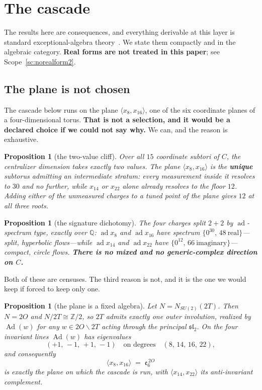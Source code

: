 \documentclass[11pt,reqno]{amsart}
\theoremstyle{plain}
\newtheorem{proposition}[theorem]{Proposition}
\theoremstyle{definition}
\theoremstyle{remark}
\newcommand{\Q}{\mathbb{Q}}
\newcommand{\Z}{\mathbb{Z}}
\newcommand{\sll}{\mathfrak{sl}}
\newcommand{\ee}{\mathfrak{e}}
\newcommand{\ad}{\operatorname{ad}}
\newcommand{\Ad}{\operatorname{Ad}}
\begin{document}
\section{The cascade}\label{sec:cascade}

The results here are consequences, and everything derivable at this layer is standard
exceptional-algebra theory~\cite{Slansky,BartonSudbery}. We state them compactly and in
the algebraic category. \textbf{Real forms are not treated in this paper}; see
Scope~\ref{sc:norealform2}.

\subsection{The plane is not chosen}\label{sec:planeforced}

The cascade below runs on the plane $\langle x_8,x_{16}\rangle$, one of the six coordinate
planes of a four-dimensional torus. \textbf{That is not a selection, and it would be a
declared choice if we could not say why.} We can, and the reason is exhaustive.

\begin{proposition}[the two-value cliff]\label{prop:cliff}
Over all $15$ coordinate subtori of $C$, the centralizer dimension takes exactly two
values. The plane $\langle x_8,x_{16}\rangle$ is the \textbf{unique} subtorus admitting an
intermediate stratum: every measurement inside it resolves to $30$ and no further, while
$x_{14}$ or $x_{22}$ \emph{alone} already resolves to the floor $12$. Adding either of the
unmeasured charges to a tuned point of the plane gives $12$ at all three roots.
\end{proposition}

\begin{proposition}[the signature dichotomy]\label{prop:dichotomy}
The four charges split $2+2$ by $\ad$-spectrum type, exactly over $\Q$: $\ad x_8$ and
$\ad x_{16}$ have spectrum $\{0^{30},\,48\ \text{real}\}$---split, hyperbolic flows---while
$\ad x_{14}$ and $\ad x_{22}$ have $\{0^{12},\,66\ \text{imaginary}\}$---compact, circle
flows. \textbf{There is no mixed and no generic-complex direction on $C$.}
\end{proposition}

Both of these are censuses. The third reason is not, and it is the one we would keep if
forced to keep only one.

\begin{proposition}[the plane is a fixed algebra]\label{prop:twoO}
Let $N=N_{SU(2)}(2T)$. Then $N=2O$ and $N/2T\cong\Z/2$, so $2T$ admits exactly one outer
involution, realized by $\Ad(w)$ for any $w\in 2O\smallsetminus 2T$ acting through the
principal $\sll_2$. On the four invariant lines $\Ad(w)$ has eigenvalues
\[
   (+1,\,-1,\,+1,\,-1)\quad\text{on degrees}\quad (8,\,14,\,16,\,22),
\]
and consequently
\[
   \boxed{\ \langle x_8,x_{16}\rangle\;=\;\ee_6^{\,2O}\ }
\]
is exactly the plane on which the cascade is run, with $\langle x_{14},x_{22}\rangle$ its
anti-invariant complement.
\end{proposition}
\end{document}
